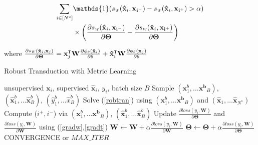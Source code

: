 \begin{small}
\begin{equation}
\begin{aligned}
 \sum_{i \in [N^s]} &\mathds{1}(\sw(\xsi,\mathbf{x_{i^-}}) - \sw(\xsi,\mathbf{x_{i^+}})>\alpha)  \\
 &\times \left(\frac{\partial \sw(\xsi,\mathbf{x_{i^-}}) }{\partial \mathbf{\Theta}} - \frac{\partial \sw(\xsi,\mathbf{x_{i^+}}) }{\partial \mathbf{\Theta}} \right)
 \label{gradt}
 \end{aligned}
\end{equation}
\end{small}
where $\frac{\partial \sw(\xsi,\xuj) }{\partial \mathbf{\Theta}} =\xuj^\intercal \mathbf{W} \frac{\partial \phi_\mathbf{\theta}(\xsi)}{\partial \theta} + \xsi^\intercal \mathbf{W} \frac{\partial \phi_\mathbf{\theta}(\xuj)}{\partial \theta} $

\begin{algorithm}[tb]
   \caption{Robust Transduction with Metric Learning}
   \label{alg:example}
\begin{algorithmic}
    unsupervised $\mathbf{x}_i$, supervised $\mathbf{\hat{x}}_i$, $y_i$, batch size $B$
   \REPEAT
   \STATE  Sample $(\mathbf{x}^b_1,\ldots \mathbf{x^b}_B)$, $(\mathbf{\hat{x}}^b_1,\ldots \mathbf{\hat{x}}^b_B)$, $(\hat{y}^b_1,\ldots \hat{x}^b_B)$
   \STATE Solve (\ref{robtran}) using $(\mathbf{x}^b_1,\ldots \mathbf{x^b}_B)$ and  $(\mathbf{\hat{x}}_1,\ldots \mathbf{\hat{x}}_{N^s})$
   \STATE Compute ($i^+, i^-$) via $(\mathbf{x}^b_1,\ldots \mathbf{x^b}_B)$, $(\mathbf{\hat{x}}^b_1,\ldots \mathbf{\hat{x}}^b_B)$ 
   \STATE Update $\frac{\partial loss (y_i, \mathbf{W})}{\partial \mathbf{\Theta}}$ and  $\frac{\partial loss (y_i, \mathbf{W})}{\partial \mathbf{W}} $ using (\ref{gradw},\ref{gradt})
   \ENDIF
   \ENDFOR
   \STATE $\mathbf{W} \leftarrow \mathbf{W} + \alpha \frac{\partial loss (y_i, \mathbf{W})}{\partial \mathbf{W}}$ 
   \STATE $\mathbf{\Theta} \leftarrow \mathbf{\Theta} + \alpha \frac{\partial loss (y_i, \mathbf{W})}{\partial \mathbf{\Theta}}$
   \UNTIL CONVERGENCE or $MAX\_ITER$
\end{algorithmic}
\end{algorithm}